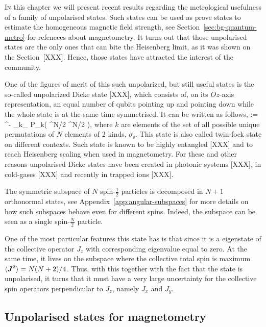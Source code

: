 \lettrine[lines=2, findent=3pt,nindent=0pt]{I}{n} this chapter we will present recent results regarding the metrological usefulness of a family of unpolarised states.
Such states can be used as prove states to estimate the homogeneous magnetic field strength, see Section~\ref{sec:bg-quantum-metro} for refeneces about magnetometry.
It turns out that those unpolarised states are the only ones that can bite the Heisenberg limit, as it was shown on the Section~{[XXX]}.
Hence, those states have attracted the interest of the community.

One of the figures of merit of this such unpolarized, but still useful states is the so-called unpolarized Dicke state [XXX], which consists of, on its $Oz$-axis  representation, an equal number of qubits pointing up and pointing down while the whole state is at the same time symmetrised.
It can be written as follows,
\be
   \equiv {}:= ^{-}
  \sum_{k\in \sigma_}
  P_{k}\left( ^{\otimes N/2} ^{\otimes N/2}
  \right),
  \label{eq:vd-unpolarised-dicke}
\ee
where $k$ are elements of the set of all possible unique permutations of $N$ elements of 2 kinds, $\sigma_\text{s}$.
This state is also called twin-fock state on different contexts.
Such state is known to be highly entangled [XXX] and to reach Heisenberg scaling when used in magnetometry.
For these and other reasons unpolarised Dicke states have been created in photonic systems [XXX], in cold-gases [XXX] and recently in trapped ions [XXX].

The symmetric subspace of $N$ spin-$\frac{1}{2}$ particles is decomposed in $N+1$ orthonormal states, see Appendix~\ref{app:angular-subspaces} for more details on how such subspaces behave even for different spins.
Indeed, the subspace can be seen as a single spin-$\frac{N}{2}$ particle.

One of the most particular features this state has is that since it is a eigenstate of the collective operator $J_z$ with corresponding eigenvalue equal to zero.
At the same time, it lives on the subspace where the collective total spin is maximum\ie $\langle \boldsymbol{J}^2 \rangle=N(N+2)/4$.
Thus, with this together with the fact that the state is unpolarised, it turns that it must have a very large uncertainty for the collective spin operators perpendicular to $J_z$, namely $J_x$ and $J_y$.

\subsection{Unpolarised states for magnetometry}

